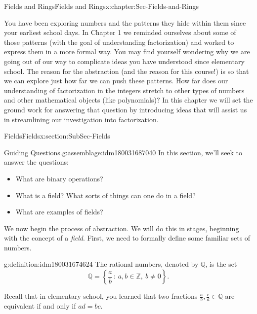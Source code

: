 \documentclass[oneside,10pt,]{book}
\numberwithin{equation}{section}
\newcommand{\setof}[2]{{\left\{#1\,\colon\,#2\right\}}}
\def\Z{{\mathbb Z}}
\def\Q{{\mathbb Q}}
\begin{document}
\begin{chapterptx}{Fields and Rings}{}{Fields and Rings}{}{}{x:chapter:Sec-Fields-and-Rings}
\begin{introduction}{}%
You have been exploring numbers and the patterns they hide within them since your earliest school days. In Chapter 1 we reminded ourselves about some of those patterns (with the goal of understanding factorization) and worked to express them in a more formal way. You may find yourself wondering why we are going out of our way to complicate ideas you have understood since elementary school. The reason for the abstraction (and the reason for this course!) is so that we can explore just how far we can push these patterns. How far does our understanding of factorization in the integers stretch to other types of numbers and other mathematical objects (like polynomials)? In this chapter we will set the ground work for answering that question by introducing ideas that will assist us in streamlining our investigation into factorization.%
\end{introduction}%
%
%
\typeout{************************************************}
\typeout{************************************************}
%
\begin{sectionptx}{Fields}{}{Fields}{}{}{x:section:SubSec-Fields}
\begin{assemblage}{Guiding Questions.}{g:assemblage:idm180031687040}%
In this section, we'll seek to answer the questions: %
\begin{itemize}[label=\textbullet]
\item{}What are binary operations?%
\item{}What is a field? What sorts of things can one do in a field?%
\item{}What are examples of fields?%
\end{itemize}
%
\end{assemblage}
We now begin the process of abstraction. We will do this in stages, beginning with the concept of a \emph{field}. First, we need to formally define some familiar sets of numbers.%
\begin{definition}{}{g:definition:idm180031674624}%
The rational numbers, denoted by \(\Q\), is the set%
\begin{equation*}
\Q = \setof{\frac{a}{b}}{a,b\in \Z, \ b\ne 0}\text{.}
\end{equation*}
%
\end{definition}
Recall that in elementary school, you learned that two fractions \(\frac{a}{b}, \frac{c}{d} \in \Q\) are equivalent if and only if \(ad=bc\).%

\end{sectionptx}
\end{chapterptx}
\end{document}
